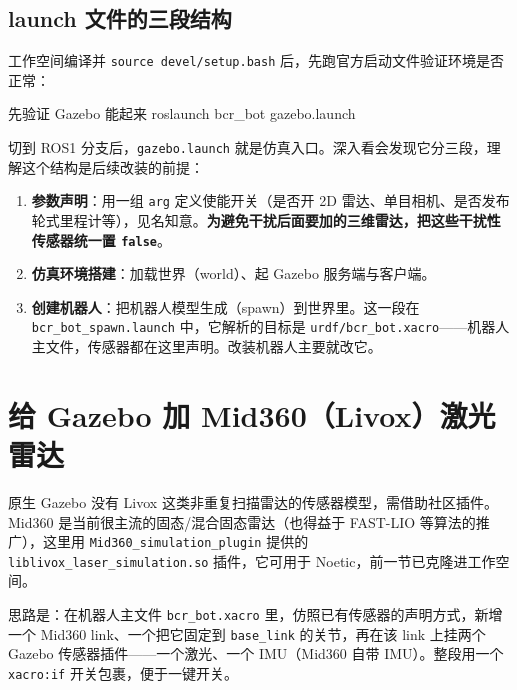 \subsection{launch 文件的三段结构}

工作空间编译并 \verb|source devel/setup.bash| 后，先跑官方启动文件验证环境是否正常：

\begin{codebox}[bash]{先验证 Gazebo 能起来}
roslaunch bcr_bot gazebo.launch
\end{codebox}

切到 ROS1 分支后，\verb|gazebo.launch| 就是仿真入口。深入看会发现它分三段，理解这个结构是后续改装的前提：

\begin{enumerate}
  \item \textbf{参数声明}：用一组 \verb|arg| 定义使能开关（是否开 2D 雷达、单目相机、是否发布轮式里程计等），见名知意。\textbf{为避免干扰后面要加的三维雷达，把这些干扰性传感器统一置 \texttt{false}}。
  \item \textbf{仿真环境搭建}：加载世界（world）、起 Gazebo 服务端与客户端。
  \item \textbf{创建机器人}：把机器人模型生成（spawn）到世界里。这一段在 \verb|bcr_bot_spawn.launch| 中，它解析的目标是 \verb|urdf/bcr_bot.xacro|——机器人主文件，传感器都在这里声明。改装机器人主要就改它。
\end{enumerate}

\section{给 Gazebo 加 Mid360（Livox）激光雷达}

原生 Gazebo 没有 Livox 这类非重复扫描雷达的传感器模型，需借助社区插件。Mid360 是当前很主流的固态/混合固态雷达（也得益于 FAST-LIO 等算法的推广），这里用 \verb|Mid360_simulation_plugin| 提供的 \verb|liblivox_laser_simulation.so| 插件，它可用于 Noetic，前一节已克隆进工作空间。

思路是：在机器人主文件 \verb|bcr_bot.xacro| 里，仿照已有传感器的声明方式，新增一个 Mid360 link、一个把它固定到 \verb|base_link| 的关节，再在该 link 上挂两个 Gazebo 传感器插件——一个激光、一个 IMU（Mid360 自带 IMU）。整段用一个 \verb|xacro:if| 开关包裹，便于一键开关。

